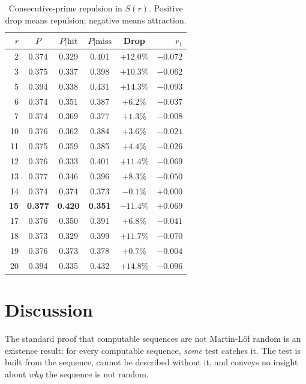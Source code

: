 \documentclass[11pt]{article}
\theoremstyle{definition}
\theoremstyle{remark}
\begin{document}
\begin{table}[h]
\centering
\begin{tabular}{rccccr}
\toprule
$r$ & $P$ & $P|\text{hit}$ & $P|\text{miss}$ & Drop & $r_1$ \\
\midrule
2  & 0.374 & 0.329 & 0.401 & $+12.0\%$ & $-0.072$ \\
3  & 0.375 & 0.337 & 0.398 & $+10.3\%$ & $-0.062$ \\
5  & 0.394 & 0.338 & 0.431 & $+14.3\%$ & $-0.093$ \\
6  & 0.374 & 0.351 & 0.387 & $+6.2\%$  & $-0.037$ \\
7  & 0.374 & 0.369 & 0.377 & $+1.3\%$  & $-0.008$ \\
10 & 0.376 & 0.362 & 0.384 & $+3.6\%$  & $-0.021$ \\
11 & 0.375 & 0.359 & 0.385 & $+4.4\%$  & $-0.026$ \\
12 & 0.376 & 0.333 & 0.401 & $+11.4\%$ & $-0.069$ \\
13 & 0.377 & 0.346 & 0.396 & $+8.3\%$  & $-0.050$ \\
14 & 0.374 & 0.374 & 0.373 & $-0.1\%$  & $+0.000$ \\
\textbf{15} & \textbf{0.377} & \textbf{0.420} & \textbf{0.351}
  & $\mathbf{-11.4\%}$ & $\mathbf{+0.069}$ \\
17 & 0.376 & 0.350 & 0.391 & $+6.8\%$  & $-0.041$ \\
18 & 0.373 & 0.329 & 0.399 & $+11.7\%$ & $-0.070$ \\
19 & 0.376 & 0.373 & 0.378 & $+0.7\%$  & $-0.004$ \\
20 & 0.394 & 0.335 & 0.432 & $+14.8\%$ & $-0.096$ \\
\bottomrule
\end{tabular}
\caption{Consecutive-prime repulsion in $S(r)$.
Positive drop means repulsion; negative means attraction.}
\label{tab:repulsion}
\end{table}

\section{Discussion}

The standard proof that computable sequences are not Martin-L\"of
random is an existence result:
for every computable sequence, \emph{some} test catches it.
The test is built from the sequence, cannot be described
without it, and conveys no insight about
\emph{why} the sequence is not random.
\end{document}
